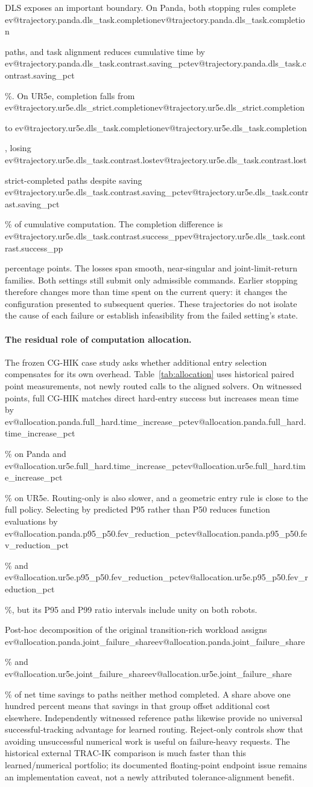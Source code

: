 \documentclass[10pt,a4paper]{article}
\makeatletter
\newcommand{\ev}[1]{\ifcsname ev@#1\endcsname\csname ev@#1\endcsname\else\PackageError{evidence}{Undefined evidence key #1}{}\fi}
\makeatother
\begin{document}
DLS exposes an important boundary. On Panda, both stopping rules complete
\ev{trajectory.panda.dls_task.completion} paths, and task alignment reduces cumulative
time by \ev{trajectory.panda.dls_task.contrast.saving_pct}\%.
On UR5e, completion falls from \ev{trajectory.ur5e.dls_strict.completion} to
\ev{trajectory.ur5e.dls_task.completion}, losing
\ev{trajectory.ur5e.dls_task.contrast.lost} strict-completed paths despite saving
\ev{trajectory.ur5e.dls_task.contrast.saving_pct}\% of cumulative computation.
The completion difference is
\ev{trajectory.ur5e.dls_task.contrast.success_pp} percentage points.
The losses span smooth, near-singular and joint-limit-return families.
Both settings still submit only admissible commands. Earlier stopping therefore
changes more than time spent on the current query: it changes the configuration
presented to subsequent queries. These trajectories do not isolate the cause of
each failure or establish infeasibility from the failed setting's state.

\paragraph{The residual role of computation allocation.}
The frozen CG-HIK case study asks whether additional entry selection compensates
for its own overhead. Table~\ref{tab:allocation} uses historical paired point
measurements, not newly routed calls to the aligned solvers.
On witnessed points, full CG-HIK matches direct hard-entry success but increases
mean time by \ev{allocation.panda.full_hard.time_increase_pct}\% on Panda and
\ev{allocation.ur5e.full_hard.time_increase_pct}\% on UR5e.
Routing-only is also slower, and a geometric entry rule is close to the full
policy. Selecting by predicted P95 rather than P50 reduces function evaluations
by \ev{allocation.panda.p95_p50.fev_reduction_pct}\% and
\ev{allocation.ur5e.p95_p50.fev_reduction_pct}\%, but its P95 and P99 ratio
intervals include unity on both robots.

Post-hoc decomposition of the original transition-rich workload assigns
\ev{allocation.panda.joint_failure_share}\% and
\ev{allocation.ur5e.joint_failure_share}\% of net time savings to paths neither
method completed. A share above one hundred percent means that savings in that
group offset additional cost elsewhere. Independently witnessed reference paths
likewise provide no universal successful-tracking advantage for learned routing.
Reject-only controls show that avoiding unsuccessful numerical work is useful
on failure-heavy requests. The historical external TRAC-IK comparison is much
faster than this learned/numerical portfolio; its documented floating-point
endpoint issue remains an implementation caveat, not a newly attributed
tolerance-alignment benefit.
\end{document}

